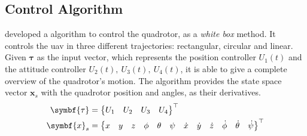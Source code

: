 \subsection{Control Algorithm}

\citet{geronel2023} developed a \matlab algorithm to control the quadrotor, as a \emph{white box} method. 
It controls the \gls*{uav} in three different trajectories: rectangular, circular and linear.
Given \(\symbf{\tau}\) as the input vector, which represents the position controller \(U_1(t)\) and the attitude controller \(U_2(t),\ U_3(t),\ U_4(t)\), it is able to give a complete overview of the quadrotor's motion.
The algorithm provides the state space vector \(\symbf{x}_s\) with the quadrotor position and angles, as their derivatives.
%
\begin{align}
    \symbf{\tau} &= \begin{Bmatrix}
        U_1 & U_2 & U_3 & U_4
    \end{Bmatrix}^{\top} \\
    \setcounter{MaxMatrixCols}{13}
    \symbf{x}_s &=
    \begin{Bmatrix}
        x&y&z&\phi&\theta&\psi&\dot{x}&\dot{y}&\dot{z}&\dot{\phi}&\dot{\theta}&\dot{\psi}
    \end{Bmatrix}^{\top}
    \label{eq:xs_vector_matlab}
\end{align}